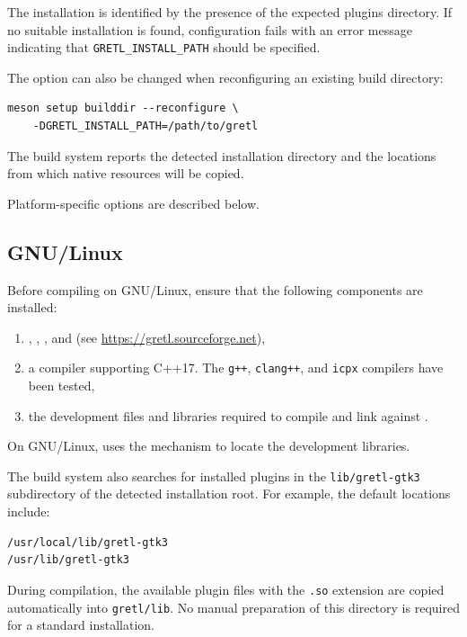 The installation is identified by the presence of the expected
plugins directory. If no suitable installation is found,
configuration fails with an error message indicating that
\texttt{GRETL\_INSTALL\_PATH} should be specified.

The option can also be changed when reconfiguring an existing
build directory:

\begin{verbatim}
meson setup builddir --reconfigure \
	-DGRETL_INSTALL_PATH=/path/to/gretl
\end{verbatim}

The build system reports the detected installation directory
and the locations from which native resources will be copied.

Platform-specific options are described below.


\subsection{GNU/Linux}\label{sec:linux-compile}
Before compiling \gretlpy on GNU/Linux, ensure that the following
components are installed:

\begin{enumerate}
	\item {}, , , and
	\gretl (see \url{https://gretl.sourceforge.net}),
	\item a \cpp compiler supporting C++17. The \texttt{g++},
		\texttt{clang++}, and \texttt{icpx} compilers have been tested,
	\item the development files and libraries required
		to compile and link against \lgretl.
\end{enumerate}

On GNU/Linux, \gretlpy uses the  mechanism
to locate the \lgretl development libraries.

The build system also searches for installed \gretl plugins
in the \texttt{lib/gretl-gtk3} subdirectory of the detected
installation root. For example, the default locations include:

\begin{verbatim}
/usr/local/lib/gretl-gtk3
/usr/lib/gretl-gtk3
\end{verbatim}

During compilation, the available plugin files with the
\texttt{.so} extension are copied automatically into
\texttt{gretl/lib}. No manual preparation of this directory
is required for a standard installation.

